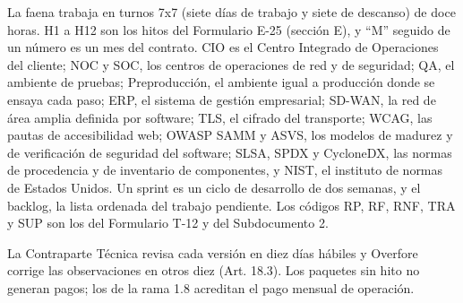 \documentclass[formulario]{../../comun/overfore}
\begin{document}
La faena trabaja en turnos 7x7 (siete días de trabajo y siete de descanso) de doce horas. H1 a H12 son los hitos del Formulario E-25 (sección E), y “M” seguido de un número es un mes del contrato. CIO es el Centro Integrado de Operaciones del cliente; NOC y SOC, los centros de operaciones de red y de seguridad; QA, el ambiente de pruebas; Preproducción, el ambiente igual a producción donde se ensaya cada paso; ERP, el sistema de gestión empresarial; SD-WAN, la red de área amplia definida por software; TLS, el cifrado del transporte; WCAG, las pautas de accesibilidad web; OWASP SAMM y ASVS, los modelos de madurez y de verificación de seguridad del software; SLSA, SPDX y CycloneDX, las normas de procedencia y de inventario de componentes, y NIST, el instituto de normas de Estados Unidos. Un sprint es un ciclo de desarrollo de dos semanas, y el backlog, la lista ordenada del trabajo pendiente. Los códigos RP, RF, RNF, TRA y SUP son los del Formulario T-12 y del Subdocumento 2.

La Contraparte Técnica revisa cada versión en diez días hábiles y Overfore corrige las observaciones en otros diez (Art. 18.3). Los paquetes sin hito no generan pagos; los de la rama 1.8 acreditan el pago mensual de operación.
\end{document}

